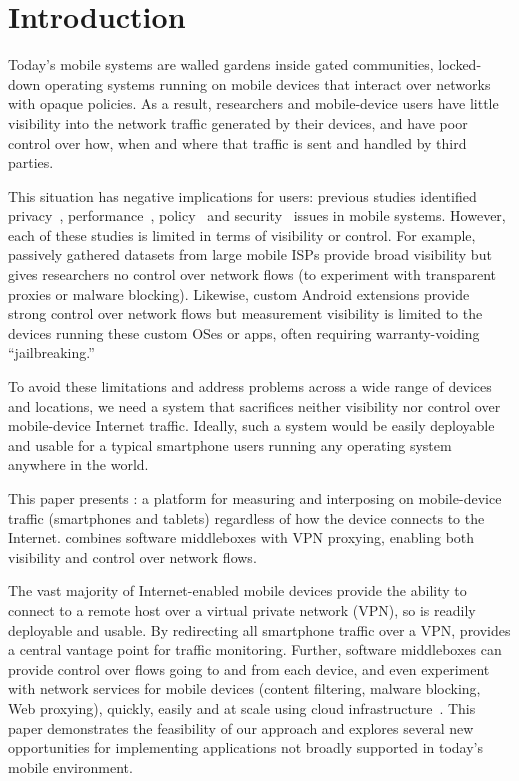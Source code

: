 \section{Introduction}
\label{sec:introduction}

Today's mobile systems are walled gardens inside gated communities, \ie{} locked-down operating systems 
running on mobile devices that interact over networks with opaque policies. As a result, 
researchers and mobile-device users have little visibility into the network traffic generated by 
their devices, and have poor control over how, when and where that traffic is sent and handled by third parties. 

This situation has negative implications for users: previous studies  
identified privacy~\cite{vallina-rod:ads}, performance~\cite{gerber:passivespeed,chen:wifi,sommers:cellwifi}, policy~\cite{wang:middleboxes} and security~\cite{enck:taintdroid} issues in mobile systems. However, each of these studies 
is limited in terms of visibility or control. 
For example, passively gathered datasets from large mobile 
ISPs provide broad visibility but gives researchers no control over network flows (\eg to experiment with 
transparent proxies or malware blocking). Likewise, custom Android extensions provide 
strong control over network flows but measurement visibility is limited to the devices running these 
custom OSes or apps, often requiring warranty-voiding ``jailbreaking.'' 

To avoid these limitations and address problems across a wide range of devices and locations, 
we need a system that sacrifices neither visibility nor control over mobile-device Internet traffic.
Ideally, such a system would be easily deployable and usable for a typical smartphone users 
running any operating system anywhere in the world.

This paper presents \meddle:  a platform for measuring and interposing on mobile-device traffic (\eg smartphones and tablets) 
regardless of how the device connects to the Internet. \meddle combines software middleboxes 
with VPN proxying, enabling both visibility and control over network flows. 

The vast majority of Internet-enabled mobile devices provide the ability to connect to a remote host over a virtual private network (VPN), so \meddle is readily deployable and usable. 
By redirecting all smartphone traffic over a VPN, \meddle provides a central vantage point for traffic monitoring.
Further, software middleboxes can provide control over flows going to and from each device, and even experiment with network services for mobile devices (\eg content filtering, malware blocking, Web proxying), quickly, easily and at scale using cloud infrastructure~\cite{sherry:middleboxes}. 
This paper demonstrates the feasibility of our approach and explores several new opportunities 
for implementing applications not broadly supported in today's mobile 
environment. 

